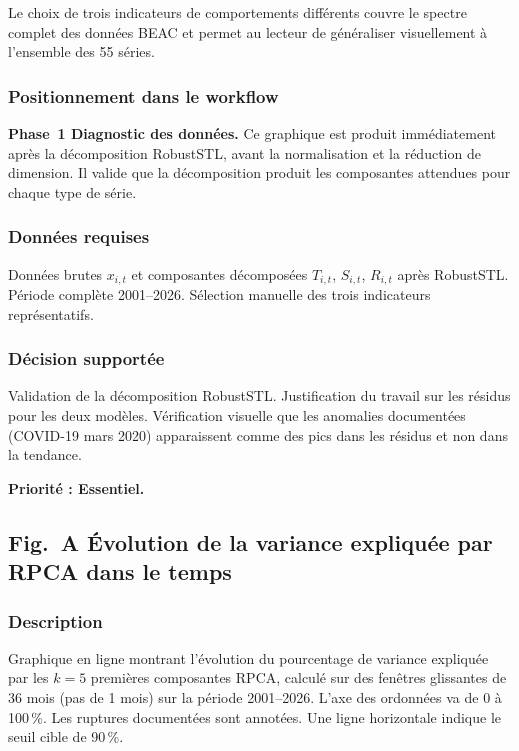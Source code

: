 \documentclass[12pt,a4paper]{article}
\begin{document}
Le choix de trois indicateurs de comportements différents couvre le spectre
complet des données BEAC et permet au lecteur de généraliser visuellement
à l'ensemble des 55 séries.

\subsubsection{Positionnement dans le workflow}

\textbf{Phase~1  Diagnostic des données.} Ce graphique est produit
immédiatement après la décomposition RobustSTL, avant la normalisation et
la réduction de dimension. Il valide que la décomposition produit les
composantes attendues pour chaque type de série.

\subsubsection{Données requises}

Données brutes $x_{i,t}$ et composantes décomposées $T_{i,t}$, $S_{i,t}$,
$R_{i,t}$ après RobustSTL. Période complète 2001--2026. Sélection manuelle
des trois indicateurs représentatifs.

\subsubsection{Décision supportée}

Validation de la décomposition RobustSTL. Justification du travail sur
les résidus pour les deux modèles. Vérification visuelle que les anomalies
documentées (COVID-19 mars 2020) apparaissent comme des pics dans les
résidus et non dans la tendance.

\textbf{Priorité : Essentiel.}

\subsection{Fig.~A  Évolution de la variance expliquée par RPCA dans le
temps}

\subsubsection{Description}

Graphique en ligne montrant l'évolution du pourcentage de variance expliquée
par les $k = 5$ premières composantes RPCA, calculé sur des fenêtres
glissantes de 36 mois (pas de 1 mois) sur la période 2001--2026. L'axe
des ordonnées va de 0 à 100\,\%. Les ruptures documentées sont annotées.
Une ligne horizontale indique le seuil cible de 90\,\%.
\end{document}
